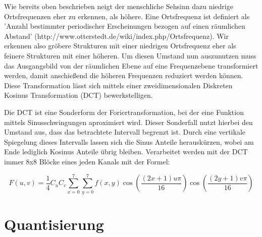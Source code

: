 
Wie bereits oben beschrieben neigt der menschliche Sehsinn dazu niedrige Ortsfrequenzen eher zu erkennen, als höhere. Eine Ortsfrequenz ist definiert als 'Anzahl bestimmter periodischer Erscheinungen bezogen auf einen räumlichen Abstand' (http://www.otterstedt.de/wiki/index.php/Ortsfrequenz). Wir erkennen also gröbere Strukturen mit einer niedrigen Ortsfrequenz eher als feinere Strukturen mit einer höheren.
Um diesen Umstand nun auszunutzen muss das Ausgangsbild von der räumlichen Ebene auf eine Frequenzebene transformiert werden, damit anschießend die höheren Frequenzen reduziert werden können. Diese Transformation lässt sich mittels einer zweidimensionalen Diskreten Kosinus Transformation (DCT) bewerkstelligen.

Die DCT ist eine Sonderform der Foriertransformation, bei der eine Funktion mittels Sinusschwingungen aproximiert wird. Dieser Sonderfall nutzt hierbei den Umstand aus, dass das betrachtete Intervall begrenzt ist. Durch eine vertikale Spiegelung dieses Intervalls lassen sich die Sinus Anteile herauskürzen, wobei am Ende lediglich Kosinus Anteile übrig bleiben. %
Verarbeitet werden mit der DCT immer 8x8 Blöcke eines jeden Kanals mit der Formel:

\[F(u,v) = \frac{1}{4} C_uC_v\sum_{x=0}^7 \sum_{y=0}^7 f(x,y) \cos \left(\frac{(2x+1)u\pi}{16}\right) \cos\left(\frac{(2y+1)v\pi}{16}\right) \]



\section{Quantisierung}
